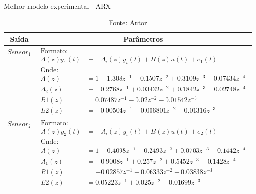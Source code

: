 \begin{table}[h]
	\centering
	\caption{Melhor modelo experimental - ARX}
	\label{tab:tclabsp-model-arx}
	\begin{tabular}{c|c} \toprule
		{Saída}			&	{Parâmetros}									\\ \midrule
		$Sensor_1$			&
								$ 
									\begin{aligned}
										\text{Formato:}																	\\
										A(z)y_1(t) &= - A_i(z)y_i(t) + B(z)u(t) + e_1(t)								\\
										\text{Onde:}																	\\
										A(z) &= 1 - 1.308 z^{-1} + 0.1507 z^{-2} + 0.3109 z^{-3} - 0.07434 z^{-4}       \\  
										A_2(z) &= -0.2768 z^{-1} + 0.03432 z^{-2} + 0.1842 z^{-3} - 0.02748 z^{-4}      \\  
										B1(z) &= 0.07487 z^{-1} - 0.02 z^{-2} - 0.01542 z^{-3}                      	\\
										B2(z) &= -0.00504 z^{-1} - 0.006801 z^{-2} - 0.01316 z^{-3}    
									\end{aligned}
								$	
							\\ \midrule
		$Sensor_2$			&
								$ 
									\begin{aligned}
										\text{Formato:}																	\\
										A(z)y_2(t) &= - A_i(z)y_i(t) + B(z)u(t) + e_2(t)								\\
										\text{Onde:}																	\\
										A(z) &= 1 - 0.4098 z^{-1} - 0.2493 z^{-2} + 0.0703 z^{-3} - 0.1442 z^{-4}    	\\   
										A_1(z) &= -0.9008 z^{-1} + 0.257 z^{-2} + 0.5452 z^{-3} - 0.1428 z^{-4}  		\\
										B1(z) &= -0.02857 z^{-1} - 0.06333 z^{-2} - 0.03838 z^{-3}          			\\
										B2(z) &= 0.05223 z^{-1} + 0.025 z^{-2} + 0.01699 z^{-3} 		
									\end{aligned}
								$
							\\ \bottomrule
	\end{tabular}
	\caption*{Fonte: Autor}
\end{table}

